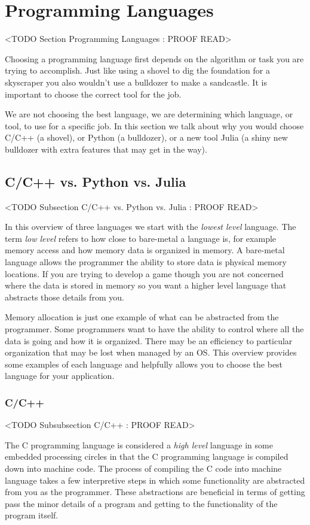 \section{Programming Languages}
	<TODO Section Programming Languages : PROOF READ>

Choosing a programming language first depends on the algorithm or task you are trying to accomplish. Just like using a shovel to dig the foundation for a skyscraper you also wouldn't use a bulldozer to make a sandcastle. It is important to choose the correct tool for the job. 	
	
We are not choosing the best language, we are determining which language, or tool, to use for a specific job. In this section we talk about why you would choose C/C++ (a shovel), or Python (a bulldozer), or a new tool Julia (a shiny new bulldozer with extra features that may get in the way). 	
	
	
\subsection{C/C++ vs. Python vs. Julia}
	<TODO Subsection C/C++ vs. Python vs. Julia : PROOF READ>

In this overview of three languages we start with the \emph{lowest level} language. The term \emph{low level} refers to how close to bare-metal a language is, for example memory access and how memory data is organized in memory. A bare-metal language allows the programmer the ability to store data is physical memory locations. If you are trying to develop a game though you are not concerned where the data is stored in memory so you want a higher level language that abstracts those details from you. 

Memory allocation is just one example of what can be abstracted from the programmer. Some programmers want to have the ability to control where all the data is going and how it is organized. There may be an efficiency to particular organization that may be lost when managed by an \ac{OS}. This overview provides some examples of each language and helpfully allows you to choose the best language for your application.

\subsubsection{C/C++}
	<TODO Subsubsection  C/C++ : PROOF READ>

The C programming language is considered a \emph{high level} language in some embedded processing circles in that the C programming language is compiled down into machine code. The process of compiling the C code into machine language takes a few interpretive steps in which some functionality are abstracted from you as the programmer. These abstractions are beneficial in terms of getting pass the minor details of a program and getting to the functionality of the program itself. 

